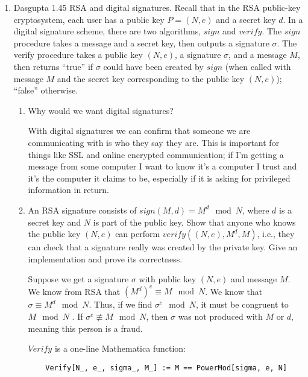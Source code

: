 \documentclass[a4paper,12pt]{article}
\begin{document}
\begin{enumerate}
\item Dasgupta 1.45
RSA and digital signatures. Recall that in the RSA public-key cryptosystem, each user has a public key $P = (N,e)$ and a secret key $d$. In a digital signature scheme, there are two algorithms, $sign$ and $verify$. The $sign$ procedure takes a message and a secret key, then outputs a signature $\sigma$. The verify procedure takes a public key $(N,e)$, a signature $\sigma$, and a message $M$, then returns ``true'' if $\sigma$ could have been created by $sign$ (when called with message $M$ and the secret key corresponding to the public key $(N,e)$); ``false'' otherwise.

\begin{enumerate}
    \item Why would we want digital signatures?

\vspace{5mm}


    With digital signatures we can confirm that someone we are communicating with is who they say they are. This is important for things like SSL and online encrypted communication; if I'm getting a message from some computer I want to know it's a computer I trust and it's the computer it claims to be, especially if it is asking for privileged information in return.

    \item An RSA signature consists of $sign(M,d) = M^d \mod N$, where $d$ is a secret key and $N$ is part of the public key. Show that anyone who knows the public key $(N,e)$ can perform $verify((N,e),M^d,M)$, i.e., they can check that a signature really was created by the private key. Give an implementation and prove its correctness.

\vspace{5mm}

    Suppose we get a signature $\sigma$ with public key $(N, e)$ and message $M$. We know from RSA that $(M^d)^e \equiv M \mod N$. We know that $\sigma \equiv M^d \mod N$. Thus, if we find $\sigma^e \mod N$, it must be congruent to $M \mod N$ . If $\sigma^e \not \equiv M \mod N$, then $\sigma$ was not produced with $M$ or $d$, meaning this person is a fraud.

\vspace{5mm}


    $Verify$ is a one-line Mathematica function:
\begin{verbatim}
    Verify[N_, e_, sigma_, M_] := M == PowerMod[sigma, e, N]
\end{verbatim}


\end{enumerate}
\end{enumerate}
\end{document}
